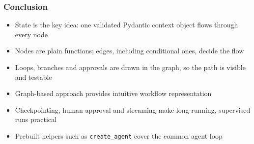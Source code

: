 \begin{frame}[fragile]\frametitle{Conclusion}
      \begin{itemize}
        \item State is the key idea: one validated Pydantic context object flows through every node
        \item Nodes are plain functions; edges, including conditional ones, decide the flow
        \item Loops, branches and approvals are drawn in the graph, so the path is visible and testable
        \item Graph-based approach provides intuitive workflow representation
        \item Checkpointing, human approval and streaming make long-running, supervised runs practical
        \item Prebuilt helpers such as \texttt{create\_agent} cover the common agent loop
      \end{itemize}
\end{frame}
